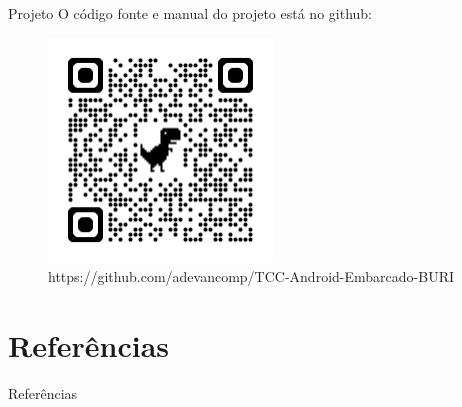 \documentclass[12pt]{beamer}
\begin{document}
    \begin{frame}{Projeto}
        O código fonte e manual do projeto está no github:
        \begin{figure}[ht]
            \centering
            \includegraphics[width=0.53\textwidth]{./img/qrcode-buri.png}
            \caption{https://github.com/adevancomp/TCC-Android-Embarcado-BURI}\label{fig:buriTRab}
        \end{figure}
    \end{frame}

    \section{Referências}

    \begin{frame}{Referências}
    
    \end{frame}
    
    \printbibliography
\end{document}

